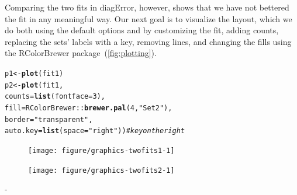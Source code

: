 \documentclass[
  oneside,
  openany,
  numbers=noendperiod,
  parskip=half,
  bibliography=totoc
]{scrbook}\usepackage[]{graphicx}\usepackage{xcolor}
\makeatletter
\newcommand{\hlnum}[1]{\textcolor[rgb]{0.686,0.059,0.569}{#1}}%
\newcommand{\hlstr}[1]{\textcolor[rgb]{0.192,0.494,0.8}{#1}}%
\newcommand{\hlcom}[1]{\textcolor[rgb]{0.678,0.584,0.686}{\textit{#1}}}%
\newcommand{\hlopt}[1]{\textcolor[rgb]{0,0,0}{#1}}%
\newcommand{\hlstd}[1]{\textcolor[rgb]{0.345,0.345,0.345}{#1}}%
\newcommand{\hlkwb}[1]{\textcolor[rgb]{0.69,0.353,0.396}{#1}}%
\newcommand{\hlkwc}[1]{\textcolor[rgb]{0.333,0.667,0.333}{#1}}%
\newcommand{\hlkwd}[1]{\textcolor[rgb]{0.737,0.353,0.396}{\textbf{#1}}}%
\newenvironment{kframe}{%
 \def\at@end@of@kframe{}%
 \ifinner\ifhmode%
  \def\at@end@of@kframe{\end{minipage}}%
  \begin{minipage}{\columnwidth}%
 \fi\fi%
 \def\FrameCommand##1{\hskip\@totalleftmargin \hskip-\fboxsep
 \colorbox{shadecolor}{##1}\hskip-\fboxsep
     \hskip-\linewidth \hskip-\@totalleftmargin \hskip\columnwidth}%
 \MakeFramed {\advance\hsize-\width
   \@totalleftmargin\z@ \linewidth\hsize
   \@setminipage}}%
 {\par\unskip\endMakeFramed%
 \at@end@of@kframe}
\newenvironment{knitrout}{}{} %
\newlength{\overhang}
\newenvironment{fullwidth}{
  \begin{addmargin*}[0em]{-\overhang}
  }{
  \end{addmargin*}
}
\newcommand{\pkg}[1]{{\fontseries{b}\selectfont #1}}
\makeatother
\begin{document}
Comparing the two fits in diagError, however, shows that we have not bettered
the fit in any meaningful way. Our next goal is to visualize the layout, which
we do both using the default options and by customizing the fit, adding
counts, replacing the sets' labels with a key, removing lines, and changing the
fills using the \pkg{RColorBrewer} package~(\cref{fig:plotting}).

\begin{knitrout}\small
{}\color{fgcolor}\begin{kframe}
\begin{alltt}
\hlstd{p1} \hlkwb{<-} \hlkwd{plot}\hlstd{(fit1)}
\hlstd{p2} \hlkwb{<-} \hlkwd{plot}\hlstd{(fit1,}
           \hlkwc{counts} \hlstd{=} \hlkwd{list}\hlstd{(}\hlkwc{fontface} \hlstd{=} \hlnum{3}\hlstd{),}
           \hlkwc{fill} \hlstd{= RColorBrewer}\hlopt{::}\hlkwd{brewer.pal}\hlstd{(}\hlnum{4}\hlstd{,} \hlstr{"Set2"}\hlstd{),}
           \hlkwc{border} \hlstd{=} \hlstr{"transparent"}\hlstd{,}
           \hlkwc{auto.key} \hlstd{=} \hlkwd{list}\hlstd{(}\hlkwc{space} \hlstd{=} \hlstr{"right"}\hlstd{))} \hlcom{# key on the right}
\end{alltt}
\end{kframe}
\end{knitrout}

\begin{figure}[hbtp]
\begin{minipage}[b]{.4\linewidth}
\begin{knitrout}\small
{}\color{fgcolor}

{\centering \texttt{[image: figure/graphics-twofits1-1]} 

}



\end{knitrout}
\end{minipage}%
\begin{minipage}[b]{.6\linewidth}
\begin{knitrout}\small
{}\color{fgcolor}

{\centering \texttt{[image: figure/graphics-twofits2-1]} 

}



\end{knitrout}
\end{minipage}
\end{figure}

\begin{fullwidth}


\end{fullwidth}
\end{document}
